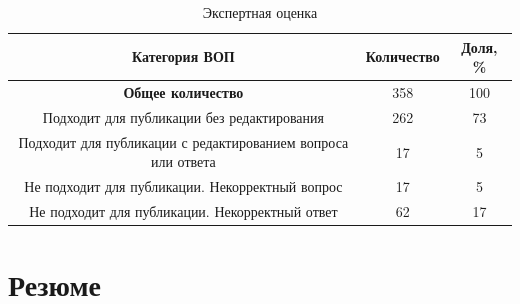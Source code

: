 \begin{table}[!ht]
\caption{Экспертная оценка}
\label{qualityExpert}
\centering
\begin{tabular}{|c|c|c|}
\hline
Категория ВОП & Количество & Доля, \% \\
\hline
\parbox[t]{4cm}{\textbf{Общее количество}} & 358 & 100 \\

	 \hline
\parbox[t]{4cm}{Подходит для публикации без редактирования} & 262 & 73 \\

	 \hline
\parbox[t]{4cm}{Подходит для публикации с редактированием вопроса или ответа} & 17 & 5\\

	 \hline
\parbox[t]{4cm}{Не подходит для публикации. Некорректный вопрос} & 17 & 5\\

	 \hline
\parbox[t]{4cm}{Не подходит для публикации. Некорректный ответ} & 62 & 17\\
\hline
\end{tabular}
\end{table}


\section{Резюме}